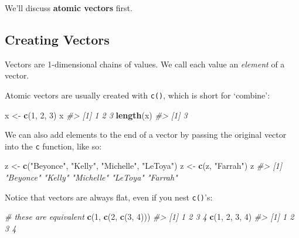 \documentclass[]{book}
\newenvironment{Shaded}{\begin{snugshade}}{\end{snugshade}}
\newcommand{\KeywordTok}[1]{\textcolor[rgb]{0.13,0.29,0.53}{\textbf{#1}}}
\newcommand{\DecValTok}[1]{\textcolor[rgb]{0.00,0.00,0.81}{#1}}
\newcommand{\StringTok}[1]{\textcolor[rgb]{0.31,0.60,0.02}{#1}}
\newcommand{\CommentTok}[1]{\textcolor[rgb]{0.56,0.35,0.01}{\textit{#1}}}
\newcommand{\NormalTok}[1]{#1}
\begin{document}
We'll discuss \textbf{atomic vectors} first.

\subsection{Creating Vectors}\label{creating-vectors}

Vectors are 1-dimensional chains of values. We call each value an
\emph{element} of a vector.

Atomic vectors are usually created with \texttt{c()}, which is short for
`combine':

\begin{Shaded}
\begin{Highlighting}[]
\NormalTok{x <-}\StringTok{ }\KeywordTok{c}\NormalTok{(}\DecValTok{1}\NormalTok{, }\DecValTok{2}\NormalTok{, }\DecValTok{3}\NormalTok{)}
\NormalTok{x}
\CommentTok{#> [1] 1 2 3}
\KeywordTok{length}\NormalTok{(x)}
\CommentTok{#> [1] 3}
\end{Highlighting}
\end{Shaded}

We can also add elements to the end of a vector by passing the original
vector into the \texttt{c} function, like so:

\begin{Shaded}
\begin{Highlighting}[]
\NormalTok{z <-}\StringTok{ }\KeywordTok{c}\NormalTok{(}\StringTok{"Beyonce"}\NormalTok{, }\StringTok{"Kelly"}\NormalTok{, }\StringTok{"Michelle"}\NormalTok{, }\StringTok{"LeToya"}\NormalTok{)}
\NormalTok{z <-}\StringTok{ }\KeywordTok{c}\NormalTok{(z, }\StringTok{"Farrah"}\NormalTok{)}
\NormalTok{z}
\CommentTok{#> [1] "Beyonce"  "Kelly"    "Michelle" "LeToya"   "Farrah"}
\end{Highlighting}
\end{Shaded}

Notice that vectors are always flat, even if you nest \texttt{c()}'s:

\begin{Shaded}
\begin{Highlighting}[]
\CommentTok{# these are equivalent}
\KeywordTok{c}\NormalTok{(}\DecValTok{1}\NormalTok{, }\KeywordTok{c}\NormalTok{(}\DecValTok{2}\NormalTok{, }\KeywordTok{c}\NormalTok{(}\DecValTok{3}\NormalTok{, }\DecValTok{4}\NormalTok{)))}
\CommentTok{#> [1] 1 2 3 4}
\KeywordTok{c}\NormalTok{(}\DecValTok{1}\NormalTok{, }\DecValTok{2}\NormalTok{, }\DecValTok{3}\NormalTok{, }\DecValTok{4}\NormalTok{)}
\CommentTok{#> [1] 1 2 3 4}
\end{Highlighting}
\end{Shaded}
\end{document}
